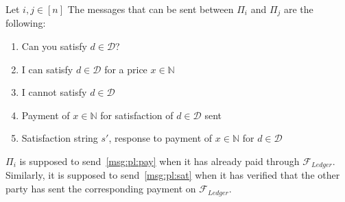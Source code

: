   Let $i, j \in \left[n\right]$ The messages that can be sent between $\Pi_i$ and $\Pi_j$
  are the following:
  \begin{enumerate}
    \item Can you satisfy $d \in \mathcal{D}$?
    \item I can satisfy $d \in \mathcal{D}$ for a price $x \in \mathbb{N}$
    \item I cannot satisfy $d \in \mathcal{D}$
    \item \label{msg:pl:pay} Payment of $x \in \mathbb{N}$ for satisfaction of $d \in \mathcal{D}$ sent
    \item \label{msg:pl:sat} Satisfaction string $s'$, response to payment of $x \in \mathbb{N}$ for $d \in
    \mathcal{D}$
  \end{enumerate}
  $\Pi_i$ is supposed to send~\ref{msg:pl:pay} when it has already paid through
  $\mathcal{F}_{Ledger}$. Similarly, it is supposed to send~\ref{msg:pl:sat} when it has
  verified that the other party has sent the corresponding payment on
  $\mathcal{F}_{Ledger}$.
